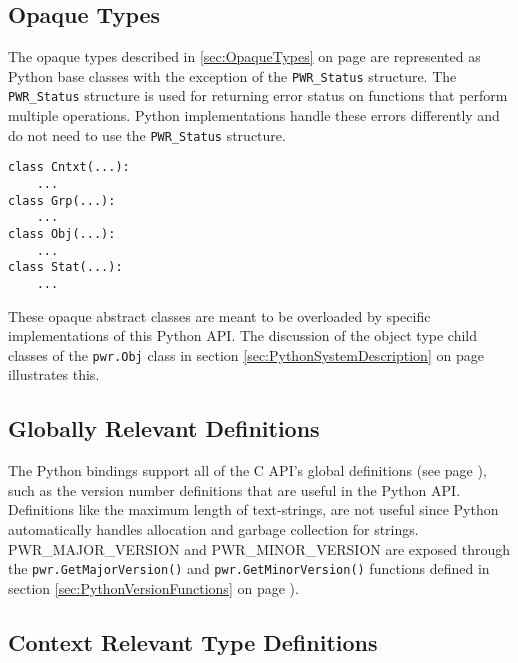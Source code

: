 \documentclass[12pt]{report} %
\begin{document}
\begin{appendices}
\subsection{Opaque Types}\label{sec:PythonOpaqueTypes}
The opaque types described in \ref{sec:OpaqueTypes} on page
\pageref{sec:OpaqueTypes} are represented as Python base classes with the
exception of the \texttt{PWR_Status} structure. The \texttt{PWR_Status}
structure is used for returning error status on functions that perform multiple
operations.  Python implementations handle these errors differently and do not
need to use the \texttt{PWR_Status} structure.

\begin{center}\begin{minipage}{.95\linewidth}\begin{lstlisting}
class Cntxt(...):
    ...
class Grp(...):
    ...
class Obj(...):
    ...
class Stat(...):
    ...
\end{lstlisting}\end{minipage}\end{center}

These opaque abstract classes are meant to be overloaded by specific
implementations of this Python API. The discussion of the object type child
classes of the \texttt{pwr.Obj} class in section
\ref{sec:PythonSystemDescription} on page \pageref{sec:PythonSystemDescription}
illustrates this. 

\subsection{Globally Relevant Definitions}
\label{sec:PythonGloballyRelevantDefinitions} 

The Python bindings support all of the C API's global definitions (see page
\pageref{sec:GlobalTypes}), such as the version number definitions that are
useful in the Python API. Definitions like the maximum length of text-strings,
are not useful since Python automatically handles allocation and garbage
collection for strings. PWR_MAJOR_VERSION and PWR_MINOR_VERSION are exposed
through the \texttt{pwr.GetMajorVersion()} and \texttt{pwr.GetMinorVersion()}
functions defined in section \ref{sec:PythonVersionFunctions} on page
\pageref{sec:PythonVersionFunctions}).

\subsection{Context Relevant Type Definitions}
\label{sec:PythonContextReleventTypeDefinitions}


\end{appendices}
\end{document}
